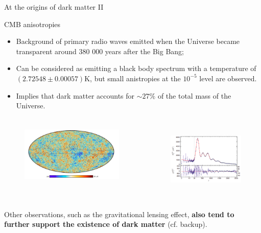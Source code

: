 \documentclass[8pt]{beamer}
\begin{document}
\begin{frame}{At the origins of dark matter II}
\justifying

\vspace{5pt}
\begin{block}{ \centering CMB anisotropies}\end{block}

\begin{itemize}
\justifying
\item Background of primary radio waves emitted when the Universe became transparent around 380 000 years after the Big Bang;
\item Can be considered as emitting a black body spectrum with a temperature of $(2.72548\pm 0.00057)$K, but small anistropies at the $10^{-5}$ level are observed.%
\item Implies that dark matter \alert{accounts for $\sim 27\%$ of the total mass of the Universe}.
\end{itemize} \vfill

\begin{columns}
	\begin{column}{0.54\textwidth}
\begin{figure}[htbp]
\begin{center}
\includegraphics[width=6.5cm, height=3cm]{figs/PlanckTemperature.png}
\end{center}
\end{figure}
\end{column}
\begin{column}{0.44\textwidth}
\begin{figure}[htbp]
\begin{center}
\includegraphics[width=5cm, height=3.5cm]{figs/PlanckSpectrum.png}
\end{center}
\end{figure}
\end{column}
\end{columns} \vfill

Other observations, such as the gravitational lensing effect, \textbf{also tend to further support the existence of dark matter} (cf. backup). \vfill
\end{frame}
\end{document}
